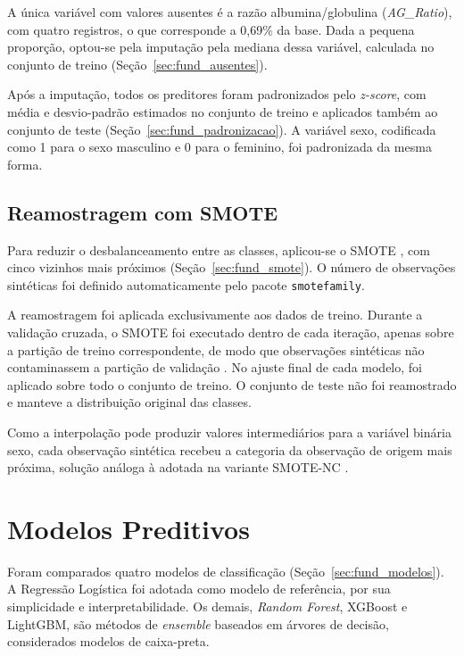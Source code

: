 A única variável com valores ausentes é a razão albumina/globulina (\textit{AG\_Ratio}), com quatro registros, o que corresponde a 0,69\% da base. Dada a pequena proporção, optou-se pela imputação pela mediana dessa variável, calculada no conjunto de treino (Seção~\ref{sec:fund_ausentes}).

Após a imputação, todos os preditores foram padronizados pelo \textit{z-score}, com média e desvio-padrão estimados no conjunto de treino e aplicados também ao conjunto de teste (Seção~\ref{sec:fund_padronizacao}). A variável sexo, codificada como 1 para o sexo masculino e 0 para o feminino, foi padronizada da mesma forma.

\subsection{Reamostragem com SMOTE}
\label{sec:balanceamento}

Para reduzir o desbalanceamento entre as classes, aplicou-se o SMOTE \cite{smote}, com cinco vizinhos mais próximos (Seção~\ref{sec:fund_smote}). O número de observações sintéticas foi definido automaticamente pelo pacote \texttt{smotefamily}.

A reamostragem foi aplicada exclusivamente aos dados de treino. Durante a validação cruzada, o SMOTE foi executado dentro de cada iteração, apenas sobre a partição de treino correspondente, de modo que observações sintéticas não contaminassem a partição de validação \cite{Santos2018CrossValidation}. No ajuste final de cada modelo, foi aplicado sobre todo o conjunto de treino. O conjunto de teste não foi reamostrado e manteve a distribuição original das classes.

Como a interpolação pode produzir valores intermediários para a variável binária sexo, cada observação sintética recebeu a categoria da observação de origem mais próxima, solução análoga à adotada na variante SMOTE-NC \cite{smote}.

\section{Modelos Preditivos}
\label{sec:modelos_preditivos}

Foram comparados quatro modelos de classificação (Seção~\ref{sec:fund_modelos}). A Regressão Logística foi adotada como modelo de referência, por sua simplicidade e interpretabilidade. Os demais, \textit{Random Forest}, XGBoost e LightGBM, são métodos de \textit{ensemble} baseados em árvores de decisão, considerados modelos de caixa-preta.

